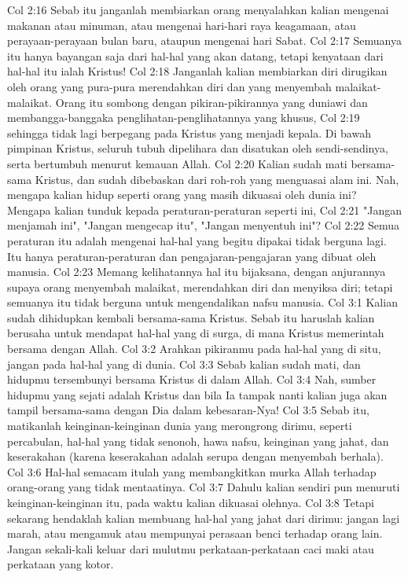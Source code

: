 Col 2:16  Sebab itu janganlah membiarkan orang menyalahkan kalian mengenai makanan atau minuman, atau mengenai hari-hari raya keagamaan, atau perayaan-perayaan bulan baru, ataupun mengenai hari Sabat.
Col 2:17  Semuanya itu hanya bayangan saja dari hal-hal yang akan datang, tetapi kenyataan dari hal-hal itu ialah Kristus!
Col 2:18  Janganlah kalian membiarkan diri dirugikan oleh orang yang pura-pura merendahkan diri dan yang menyembah malaikat-malaikat. Orang itu sombong dengan pikiran-pikirannya yang duniawi dan membangga-banggaka penglihatan-penglihatannya yang khusus,
Col 2:19  sehingga tidak lagi berpegang pada Kristus yang menjadi kepala. Di bawah pimpinan Kristus, seluruh tubuh dipelihara dan disatukan oleh sendi-sendinya, serta bertumbuh menurut kemauan Allah.
Col 2:20  Kalian sudah mati bersama-sama Kristus, dan sudah dibebaskan dari roh-roh yang menguasai alam ini. Nah, mengapa kalian hidup seperti orang yang masih dikuasai oleh dunia ini? Mengapa kalian tunduk kepada peraturan-peraturan seperti ini,
Col 2:21  "Jangan menjamah ini", "Jangan mengecap itu", "Jangan menyentuh ini"?
Col 2:22  Semua peraturan itu adalah mengenai hal-hal yang begitu dipakai tidak berguna lagi. Itu hanya peraturan-peraturan dan pengajaran-pengajaran yang dibuat oleh manusia.
Col 2:23  Memang kelihatannya hal itu bijaksana, dengan anjurannya supaya orang menyembah malaikat, merendahkan diri dan menyiksa diri; tetapi semuanya itu tidak berguna untuk mengendalikan nafsu manusia.
Col 3:1  Kalian sudah dihidupkan kembali bersama-sama Kristus. Sebab itu haruslah kalian berusaha untuk mendapat hal-hal yang di surga, di mana Kristus memerintah bersama dengan Allah.
Col 3:2  Arahkan pikiranmu pada hal-hal yang di situ, jangan pada hal-hal yang di dunia.
Col 3:3  Sebab kalian sudah mati, dan hidupmu tersembunyi bersama Kristus di dalam Allah.
Col 3:4  Nah, sumber hidupmu yang sejati adalah Kristus dan bila Ia tampak nanti kalian juga akan tampil bersama-sama dengan Dia dalam kebesaran-Nya!
Col 3:5  Sebab itu, matikanlah keinginan-keinginan dunia yang merongrong dirimu, seperti percabulan, hal-hal yang tidak senonoh, hawa nafsu, keinginan yang jahat, dan keserakahan (karena keserakahan adalah serupa dengan menyembah berhala).
Col 3:6  Hal-hal semacam itulah yang membangkitkan murka Allah terhadap orang-orang yang tidak mentaatinya.
Col 3:7  Dahulu kalian sendiri pun menuruti keinginan-keinginan itu, pada waktu kalian dikuasai olehnya.
Col 3:8  Tetapi sekarang hendaklah kalian membuang hal-hal yang jahat dari dirimu: jangan lagi marah, atau mengamuk atau mempunyai perasaan benci terhadap orang lain. Jangan sekali-kali keluar dari mulutmu perkataan-perkataan caci maki atau perkataan yang kotor.
